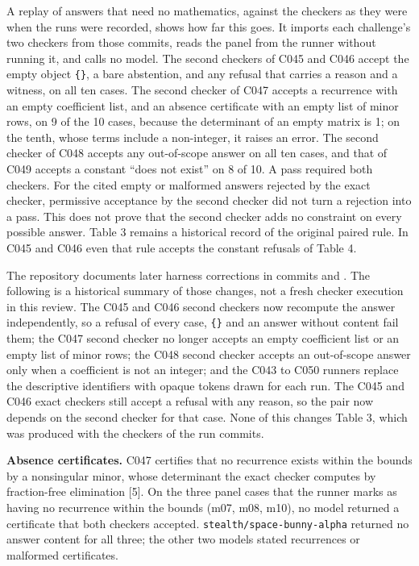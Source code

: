 \documentclass[
  11pt,
]{article}
\begin{document}
A replay of answers that need no mathematics, against the checkers as
they were when the runs were recorded, shows how far this goes. It
imports each challenge's two checkers from those commits, reads the
panel from the runner without running it, and calls no model. The second
checkers of C045 and C046 accept the empty object \texttt{\{\}}, a bare
abstention, and any refusal that carries a reason and a witness, on all
ten cases. The second checker of C047 accepts a recurrence with an empty
coefficient list, and an absence certificate with an empty list of minor
rows, on 9 of the 10 cases, because the determinant of an empty matrix
is 1; on the tenth, whose terms include a non-integer, it raises an
error. The second checker of C048 accepts any out-of-scope answer on all
ten cases, and that of C049 accepts a constant ``does not exist'' on 8
of 10. A pass required both checkers. For the cited empty or malformed
answers rejected by the exact checker, permissive acceptance by the
second checker did not turn a rejection into a pass. This does not prove
that the second checker adds no constraint on every possible answer.
Table 3 remains a historical record of the original paired rule. In C045
and C046 even that rule accepts the constant refusals of Table 4.

The repository documents later harness corrections in commits
\texttt{} and
\texttt{}. The
following is a historical summary of those changes, not a fresh checker
execution in this review. The C045 and C046 second checkers now
recompute the answer independently, so a refusal of every case,
\texttt{\{\}} and an answer without content fail them; the C047 second
checker no longer accepts an empty coefficient list or an empty list of
minor rows; the C048 second checker accepts an out-of-scope answer only
when a coefficient is not an integer; and the C043 to C050 runners
replace the descriptive identifiers with opaque tokens drawn for each
run. The C045 and C046 exact checkers still accept a refusal with any
reason, so the pair now depends on the second checker for that case.
None of this changes Table 3, which was produced with the checkers of
the run commits.

\textbf{Absence certificates.} C047 certifies that no recurrence exists
within the bounds by a nonsingular minor, whose determinant the exact
checker computes by fraction-free elimination {[}5{]}. On the three
panel cases that the runner marks as having no recurrence within the
bounds (m07, m08, m10), no model returned a certificate that both
checkers accepted.
\texttt{stealth/\allowbreak{}space-\allowbreak{}bunny-\allowbreak{}alpha}
returned no answer content for all three; the other two models stated
recurrences or malformed certificates.
\end{document}
